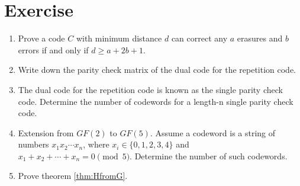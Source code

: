 \section{Exercise}
\begin{enumerate}
    \item Prove a code \(C\) with minimum distance \(d\) can correct any \(a\) erasures and \(b\) errors if and only if \(d \geq a + 2b +1\).
    \item Write down the parity check matrix of the dual code for the repetition code. 
    \item The dual code for the repetition code is known as the single parity check code. Determine the number of codewords for a length-n single parity check code. 
    \item Extension from \(GF(2)\) to \(GF(5)\). Assume a codeword is a string of numbers \(x_1x_2\cdots x_n\), where \(x_i \in \{0, 1, 2, 3, 4\}\) and \(x_1 + x_2 + \cdots + x_n = 0 \pmod 5\). Determine the number of such codewords.
    \item Prove theorem \ref{thm:HfromG}.
\end{enumerate}


